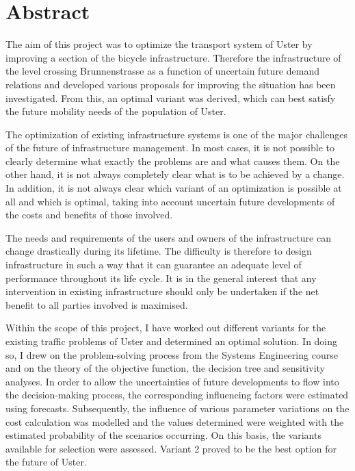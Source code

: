 %
%
%
%

\chapter*{Abstract}
\label{chap:abstract}


The aim of this project was to optimize the transport system of Uster by improving a section of the bicycle infrastructure. Therefore the infrastructure of the level crossing Brunnenstrasse as a function of uncertain future demand relations and developed various proposals for improving the situation has been investigated. From this, an optimal variant was derived, which can best satisfy the future mobility needs of the population of Uster.

The optimization of existing infrastructure systems is one of the major challenges of the future of infrastructure management. In most cases, it is not possible to clearly determine what exactly the problems are and what causes them. On the other hand, it is not always completely clear what is to be achieved by a change. In addition, it is not always clear which variant of an optimization is possible at all and which is optimal, taking into account uncertain future developments of the costs and benefits of those involved.

The needs and requirements of the users and owners of the infrastructure can change drastically during its lifetime. The difficulty is therefore to design infrastructure in such a way that it can guarantee an adequate level of performance throughout its life cycle. It is in the general interest that any intervention in existing infrastructure should only be undertaken if the net benefit to all parties involved is maximised.

Within the scope of this project, I have worked out different variants for the existing traffic problems of Uster and determined an optimal solution. In doing so, I drew on the problem-solving process from the Systems Engineering course and on the theory of the objective function, the decision tree and sensitivity analyses. In order to allow the uncertainties of future developments to flow into the decision-making process, the corresponding influencing factors were estimated using forecasts. Subsequently, the influence of various parameter variations on the cost calculation was modelled and the values determined were weighted with the estimated probability of the scenarios occurring. On this basis, the variants available for selection were assessed. Variant 2 proved to be the best option for the future of Uster.




%


